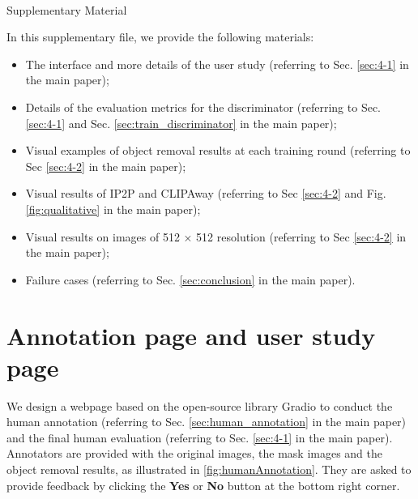 \clearpage
\appendix
\setcounter{page}{1}
\onecolumn

\begin{center}
    \Large
    \textbf{\thetitle} \\ %
    \vspace{0.5em} %
    Supplementary Material \\
    \vspace{1.0em} %
\end{center}

In this supplementary file, we provide the following materials:

\begin{itemize}[leftmargin=2em]
    \item The interface and more details of the user study (referring to Sec. \ref{sec:4-1} in the main paper);
    \item Details of the evaluation metrics for the discriminator (referring to Sec. \ref{sec:4-1} and Sec. \ref{sec:train_discriminator} in the main paper);
    \item Visual examples of object removal results at each training round (referring to Sec \ref{sec:4-2} in the main paper);
    \item Visual results of IP2P and CLIPAway (referring to Sec \ref{sec:4-2} and Fig. \ref{fig:qualitative} in the main paper);
    \item Visual results on images of 512 × 512 resolution (referring to Sec \ref{sec:4-2} in the main paper);
    \item Failure cases (referring to Sec. \ref{sec:conclusion} in the main paper).
\end{itemize}

\section{Annotation page and user study page}
\label{sec:SP1}

We design a webpage based on the open-source library Gradio \cite{abid2019gradio} to conduct the human annotation (referring to Sec. \ref{sec:human_annotation} in the main paper) and the final human evaluation (referring to Sec. \ref{sec:4-1} in the main paper). Annotators are provided with the original images, the mask images and the object removal results, as illustrated in \cref{fig:humanAnnotation}. They are asked to provide feedback by clicking the \textbf{Yes} or \textbf{No} button at the bottom right corner.

